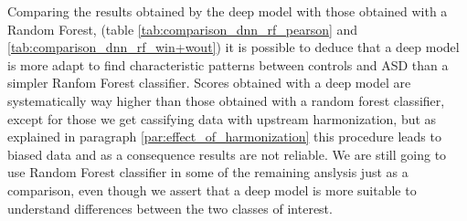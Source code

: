 \documentclass[11pt]{report}
\begin{document}
Comparing the results obtained by the deep model with those obtained with a Random Forest, (table \ref{tab:comparison_dnn_rf_pearson} and \ref{tab:comparison_dnn_rf_win+wout}) it is possible to deduce that a deep model is more adapt to find characteristic patterns between controls and ASD than a simpler Ranfom Forest classifier.
Scores obtained with a deep model are systematically way higher than those obtained with a random forest classifier, except for those we get cassifying data with upstream harmonization, but as explained in paragraph \ref{par:effect_of_harmonization} this procedure leads to biased data and as a consequence results are not reliable.
We are still going to use Random Forest classifier in some of the remaining anslysis just as a comparison, even though we assert that a deep model is more suitable to understand differences between the two classes of interest.
\end{document}
